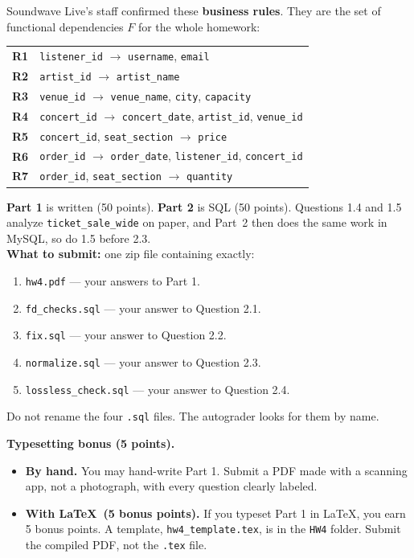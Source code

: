 \documentclass[11pt]{article}
\newcommand{\code}[1]{\texttt{#1}}
\begin{document}
Soundwave Live's staff confirmed these \textbf{business rules}. They are the
set of functional dependencies $F$ for the whole homework:

\begin{center}
\begin{tabular}{@{}ll@{}}
\toprule
\textbf{R1} & \code{listener\_id} $\rightarrow$ \code{username}, \code{email}\\
\textbf{R2} & \code{artist\_id} $\rightarrow$ \code{artist\_name}\\
\textbf{R3} & \code{venue\_id} $\rightarrow$ \code{venue\_name}, \code{city}, \code{capacity}\\
\textbf{R4} & \code{concert\_id} $\rightarrow$ \code{concert\_date}, \code{artist\_id}, \code{venue\_id}\\
\textbf{R5} & \code{concert\_id}, \code{seat\_section} $\rightarrow$ \code{price}\\
\textbf{R6} & \code{order\_id} $\rightarrow$ \code{order\_date}, \code{listener\_id}, \code{concert\_id}\\
\textbf{R7} & \code{order\_id}, \code{seat\_section} $\rightarrow$ \code{quantity}\\
\bottomrule
\end{tabular}
\end{center}

\textbf{Part 1} is written (50 points). \textbf{Part 2} is SQL (50 points).
Questions 1.4 and 1.5 analyze \code{ticket\_sale\_wide} on paper, and Part~2 then
does the same work in MySQL, so do 1.5 before 2.3.
\\


\textbf{What to submit:} one zip file containing exactly:
\begin{enumerate}[nosep]
  \item \code{hw4.pdf} --- your answers to Part 1.
  \item \code{fd\_checks.sql} --- your answer to Question 2.1.
  \item \code{fix.sql} --- your answer to Question 2.2.
  \item \code{normalize.sql} --- your answer to Question 2.3.
  \item \code{lossless\_check.sql} --- your answer to Question 2.4.
\end{enumerate}
Do not rename the four \code{.sql} files. The autograder looks for them by name.

\textbf{Typesetting bonus (5 points).}
\begin{itemize}
  \item \textbf{By hand.} You may hand-write Part 1. Submit a PDF made with a
  scanning app, not a photograph, with every question clearly labeled.
  \item \textbf{With \LaTeX\ (5 bonus points).} If you typeset Part 1 in \LaTeX,
  you earn 5 bonus points. A template, \code{hw4\_template.tex}, is in the
  \code{HW4} folder. Submit the compiled PDF, not the \code{.tex} file.
\end{itemize}
\end{document}
